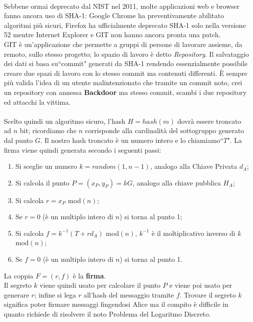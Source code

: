 \documentclass[a4paper,12pt]{tesiinfo}
\begin{document}
\\
Sebbene ormai deprecato dal NIST nel 2011, molte applicazioni web e browser fanno ancora uso di SHA-1: Google Chrome ha preventivamente abilitato algoritmi pi\`u sicuri, Firefox ha ufficialmente deprecato SHA-1 solo nella versione 52 mentre Internet Explorer e GIT non hanno ancora pronta una patch. \\
GIT \`e un'applicazione che permette a gruppi di persone di lavorare assieme, da remoto, sullo stesso progetto; lo spazio di lavoro \`e detto \textit{Repository}. Il salvataggio dei dati si basa su``commit" generati da SHA-1 rendendo essenzialmente possibile creare due spazi di lavoro con lo stesso commit ma contenuti differenti. \`E sempre pi\`u valida l'idea di un utente malintenzionato che tramite un commit noto, crei un repository con annessa \textbf{Backdoor} ma stesso commit, scambi i due repository ed attacchi la vittima.
\\
\\
Scelto quindi un algoritmo sicuro, l'hash $H = hash(m)$ dovr\`a essere troncato ad $n$ bit; ricordiamo che $n$ corrisponde alla cardinalit\`a del sottogruppo generato dal punto $G$. Il nostro hash troncato \`e un numero intero e lo chiamiamo``$T$". La firma viene quindi generata secondo i seguenti passi:
\begin{enumerate}
    \item Si sceglie un numero $k = random(1, n-1)$, analogo alla Chiave Privata $d_A$;
    \item Si calcola il punto $P = (x_P, y_P) = kG$, analogo alla chiave pubblica $H_A$;
    \item Si calcola $r = x_P $ mod$(n)$;
    \item Se $r = 0$ (\`e un multiplo intero di $n$) si torna al punto 1;
    \item Si calcola $f = k^{-1} (T+rd_A) $ mod$(n)$, $k^{-1}$ \`e il moltiplicativo inverso di $k$ mod$(n)$;
    \item Se $f = 0$ (\`e un multiplo intero di $n$) si torna al punto 1.
\end{enumerate}
La coppia $F = (r, f)$ \`e la \textbf{firma}.
\\
Il segreto $k$ viene quindi usato per calcolare il punto $P$ e viene poi usato per generare $r$; infine si lega $r$ all'hash del messaggio tramite $f$. Trovare il segreto $k$ significa poter firmare messaggi fingendosi Alice ma il compito \`e difficile in quanto richiede di risolvere il noto Problema del Logaritmo Discreto.
\\
\end{document}
